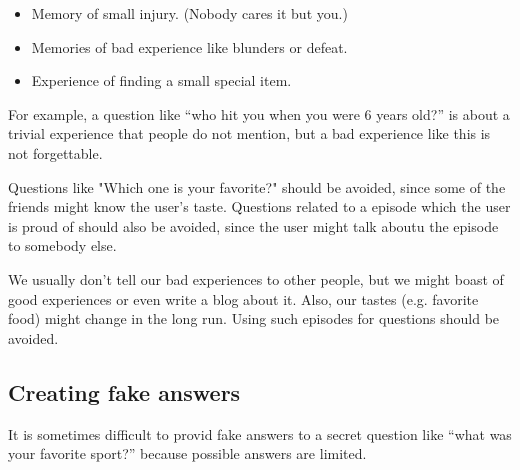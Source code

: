 \documentclass{article}
\begin{document}
\begin{itemize}
\item Memory of small injury. (Nobody cares it but you.)

\item Memories of bad experience like blunders or defeat.

\item Experience of finding a small special item.
\end{itemize}

For example, a question like
``who hit you when you were 6 years old?''
is about a trivial experience that people do not mention,
but a bad experience like this is not forgettable.

Questions like "Which one is your favorite?" should be avoided,
since some of the friends might know the user's taste.
Questions related to a episode which the user is proud of should also be
avoided, since the user might talk aboutu the episode to somebody else.

We usually don't tell our bad experiences to other people,
but we might boast of good experiences or even write a blog about it.
Also, our tastes (e.g. favorite food) might change in the long run.
Using such episodes for questions should be avoided.

% 
% 
% 
% 

\subsection{Creating fake answers}


It is sometimes difficult to provid fake answers to a secret question like
``what was your favorite sport?''
because possible answers are limited.
\end{document}
